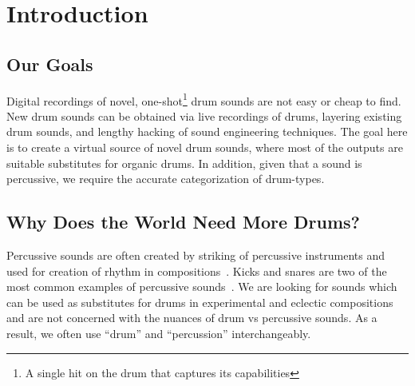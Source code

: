 \documentclass[\main/thesis.tex]{subfiles}
\begin{document}
\chapter{Introduction}

 
\section{Our Goals}
Digital recordings of novel, one-shot\footnote{A single hit on the drum that captures its capabilities} drum sounds are not easy or cheap to find. New drum sounds can be obtained via live recordings of drums, layering existing drum sounds, and lengthy hacking of sound engineering techniques. The goal here is to create a virtual source of novel drum sounds, where most of the outputs are suitable substitutes for organic drums. In addition, given that a sound is percussive, we require the accurate categorization of drum-types.




\section{Why Does the World Need More Drums?}
Percussive sounds are often created by striking of percussive instruments and used for creation of rhythm in compositions~\cite{needham1967percussion}. Kicks and snares are two of the most common examples of percussive sounds~\cite{barry2005drum}. We are looking for sounds which can be used as substitutes for drums in experimental and eclectic compositions and are not concerned with the nuances of drum vs percussive sounds. As a result, we often use \enquote{drum} and \enquote{percussion} interchangeably.
\end{document}
